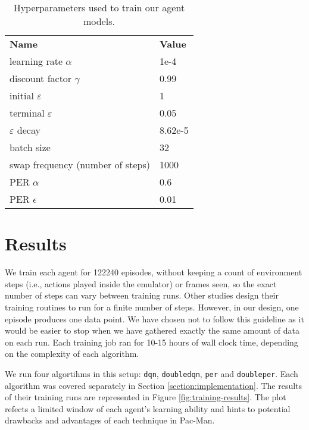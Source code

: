 \begin{table}
    \centering
        \begin{tabular}{ll}
            \textbf{Name}                  & \textbf{Value}   \\
            learning rate $\alpha$             & 1e-4    \\
            discount factor $\gamma$           & 0.99    \\
            initial $\varepsilon$              & 1       \\
            terminal $\varepsilon$             & 0.05    \\
            $\varepsilon$ decay                & 8.62e-5 \\
            batch size                         & 32      \\
            swap frequency (number of steps)   & 1000    \\
            PER $\alpha$                       & 0.6     \\
            PER $\epsilon$                     & 0.01    \\
        \end{tabular}%
        \caption{Hyperparameters used to train our agent models.}
    \label{tab:our-hyperparameters}
\end{table}

\section{Results}
We train each agent for \num{122240} episodes, without keeping a count of environment steps (i.e., actions played inside the emulator) or frames seen, so the exact number of steps can vary between training runs.
Other studies design their training routines to run for a finite number of steps.
However, in our design, one episode produces one data point. We have chosen not to follow this guideline as it would be easier to stop when we have gathered exactly the same amount of data on each run.
Each training job ran for 10-15 hours of wall clock time, depending on the complexity of each algorithm.

We run four algortihms in this setup: \texttt{dqn}, \texttt{doubledqn}, \texttt{per} and \texttt{doubleper}.
Each algorithm was covered separately in Section \ref{section:implementation}.
The results of their training runs are represented in Figure \ref{fig:training-results}.
The plot refects a limited window of each agent's learning ability and hints to potential drawbacks and advantages of each technique in Pac-Man.

